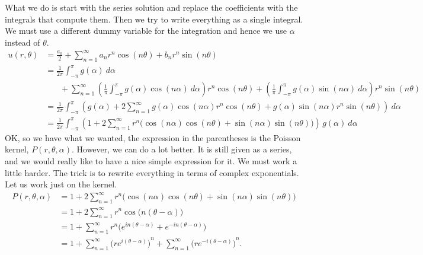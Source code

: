\documentclass[12pt]{book}
\begin{document}
What we do is start with the series solution and replace the coefficients
with the integrals that compute them.  Then we try to write everything as
a single integral.  We must use a different dummy variable for the
integration and hence we use $\alpha$ instead of $\theta$.
\begin{equation*}
\begin{split}
u(r,\theta)
& =
\frac{a_0}{2} +
\sum_{n=1}^\infty
a_n r^n \cos(n \theta) + b_n r^n \sin(n \theta)
\\
& =
\frac{1}{2\pi} \int_{-\pi}^\pi g(\alpha) ~ d\alpha
\\
& ~~~~~~~~ +
\sum_{n=1}^\infty
\left( \frac{1}{\pi} \int_{-\pi}^\pi g(\alpha) \cos (n\alpha) ~ d\alpha
\right)
r^n \cos(n \theta) +
\left( \frac{1}{\pi} \int_{-\pi}^\pi g(\alpha) \sin (n\alpha) ~ d\alpha
\right)
r^n \sin(n \theta)
\\
& =
\frac{1}{2\pi}
\int_{-\pi}^\pi
\left(  g(\alpha)
+
2
\sum_{n=1}^\infty
g(\alpha) \cos (n\alpha) 
r^n \cos(n \theta) +
g(\alpha) \sin (n\alpha)
r^n \sin(n \theta)
\right) ~d\alpha
\\
& =
\frac{1}{2\pi}
\int_{-\pi}^\pi
\left( 1
+
2
\sum_{n=1}^\infty
r^n 
\bigl(
\cos (n\alpha) 
\cos(n \theta) +
\sin (n\alpha)
\sin(n \theta) \bigr)
\right) \, g(\alpha) ~d\alpha
\end{split}
\end{equation*}
OK, so we have what we wanted, the expression in the parentheses is the
Poisson kernel, $P(r,\theta,\alpha)$.  However, we can do a lot better.  It is still given as a
series, and we would really like to have a nice simple expression for it. 
We must work a little harder.  The trick is to rewrite everything in terms of
complex exponentials.  Let us work
just on the kernel.
\begin{equation*}
\begin{split}
P(r,\theta,\alpha)
& =
1
+
2
\sum_{n=1}^\infty
r^n 
\bigl(
\cos (n\alpha) 
\cos(n \theta) +
\sin (n\alpha)
\sin(n \theta) \bigr)
\\
& =
1
+
2
\sum_{n=1}^\infty
r^n 
\cos \bigl(n(\theta-\alpha)\bigr)
\\
& =
1
+
\sum_{n=1}^\infty
r^n 
\bigl(
e^{in(\theta-\alpha)} +
e^{-in(\theta-\alpha)} \bigr)
\\
& =
1
+
\sum_{n=1}^\infty
{\bigl(
re^{i(\theta-\alpha)}\bigr)}^{n}
+
\sum_{n=1}^\infty
{\bigl(
re^{-i(\theta-\alpha)}\bigr)}^{n} .
\end{split}
\end{equation*}
\end{document}
